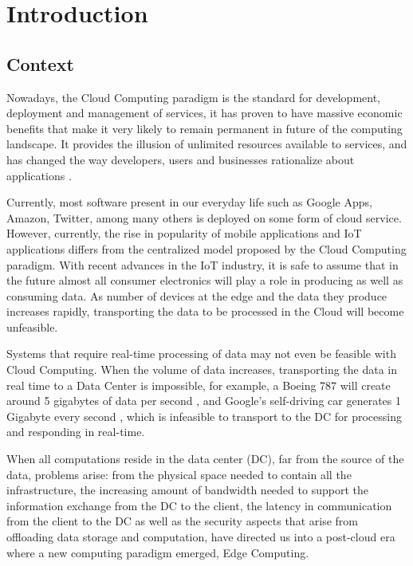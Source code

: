 \newcommand{\novathesis}{\emph{novathesis}}
\newcommand{\novathesisclass}{\texttt{novathesis.cls}}


\chapter{Introduction}
\label{cha:introduction}

\section{Context}

Nowadays, the Cloud Computing paradigm is the standard for development, deployment and management of services, it has proven to have massive economic benefits that make it very likely to remain permanent in future of the computing landscape. It provides the illusion of unlimited resources available to services, and has changed the way developers, users and businesses rationalize about  applications \cite{10.1145/1721654.1721672}.

Currently, most software present in our everyday life such as Google Apps,
Amazon, Twitter, among many others is deployed on some form of cloud service. However, currently, the rise in popularity of mobile applications and IoT applications differs from the centralized model proposed by the Cloud Computing paradigm. With recent advances in the IoT
industry, it is safe to assume that in the future almost all consumer electronics will play a role in producing as well as consuming data. As number of devices at the edge and the data they produce increases rapidly, transporting the data to be processed in the Cloud will become unfeasible. 

Systems that require real-time processing of data may not even be feasible with Cloud Computing. When the volume of data increases, transporting the data in real time to a Data Center is impossible, for example, a  Boeing 787 will create around 5 gigabytes of data per second \cite{finnegan_2013}, and Google's self-driving car generates 1 Gigabyte every second \cite{datafloq}, which is infeasible to transport to the DC for processing and responding in real-time. 

When all computations reside in the data center (DC), far from the source of the data, problems arise: from the physical space needed to contain all the infrastructure, the increasing amount of bandwidth needed to support the information exchange from the DC to the client, the latency in communication from the client to the DC as well as the security aspects that arise from offloading data storage and computation, have directed us into a post-cloud era where a new computing paradigm emerged, Edge Computing. 

